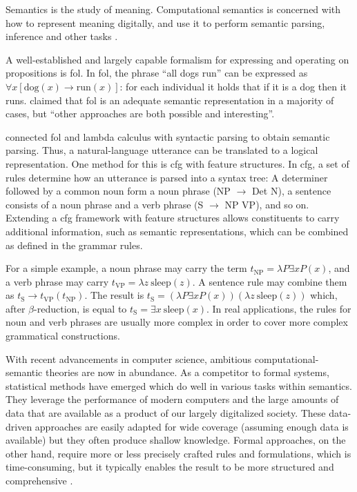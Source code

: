 Semantics is the study of meaning.
Computational semantics is concerned with how to represent meaning digitally, and use it to perform semantic parsing, inference and other tasks \citep{BlackburnComputationalsemantics2003}.

A well-established and largely capable formalism for expressing and operating on propositions is \gls{fol}.
In \gls{fol}, the phrase ``all dogs run'' can be expressed as $\forall x [ \text{dog}(x) \rightarrow \text{run}(x) ]$:
for each individual it holds that if it is a dog then it runs.
\cite{BlackburnComputationalsemantics2003} claimed that \gls{fol} is an adequate semantic representation in a majority of cases, but ``other approaches are both possible and interesting''.

\cite{MontagueFormalPhilosophySelected1974} connected \gls{fol} and lambda calculus with syntactic parsing to obtain semantic parsing.
Thus, a natural-language utterance can be translated to a logical representation.
One method for this is \gls{cfg} with feature structures.
In \gls{cfg}, a set of rules determine how an utterance is parsed into a syntax tree:
A determiner followed by a common noun form a noun phrase (NP $\rightarrow$ Det N), a sentence consists of a noun phrase and a verb phrase (S $\rightarrow$ NP VP), and so on.
Extending a \gls{cfg} framework with feature structures allows constituents to carry additional information, such as semantic representations, which can be combined as defined in the grammar rules.

For a simple example, a noun phrase may carry the term $t_{\text{NP}} = \lambda P \exists x P(x)$, and a verb phrase may carry $t_\text{VP} = \lambda z \ \text{sleep}(z)$.
A sentence rule may combine them as $t_\text{S} \rightarrow t_\text{VP}(t_\text{NP})$.
The result is $t_\text{S} = (\lambda P \exists x P(x)) (\lambda z \ \text{sleep}(z))$ which, after $\beta$-reduction, is equal to $t_\text{S} = \exists x \ \text{sleep}(x)$.
In real applications, the rules for noun and verb phrases are usually more complex in order to cover more complex grammatical constructions.

With recent advancements in computer science, ambitious computational-semantic theories are now in abundance.
As a competitor to formal systems, statistical methods have emerged which do well in various tasks within semantics.
They leverage the performance of modern computers and the large amounts of data that are available as a product of our largely digitalized society.
These data-driven approaches are easily adapted for wide coverage (assuming enough data is available) but they often produce shallow knowledge.
Formal approaches, on the other hand, require more or less precisely crafted rules and formulations, which is time-consuming, but it typically enables the result to be more structured and comprehensive \citep{Dobnik:2017ag}.

